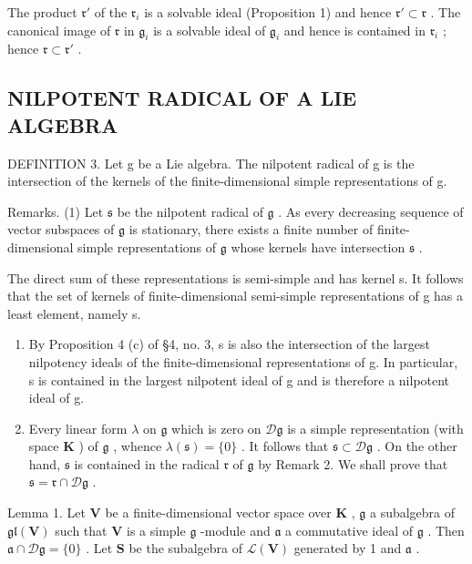 The product \(\mathfrak{r}'\) of the \(\mathfrak{r}_i\) is a solvable ideal (Proposition 1) and hence \(\mathfrak{r}' \subset \mathfrak{r}\) . The canonical image of \(\mathfrak{r}\) in \(\mathfrak{g}_i\) is a solvable ideal of \(\mathfrak{g}_i\) and hence is contained in \(\mathfrak{r}_i\) ; hence \(\mathfrak{r} \subset \mathfrak{r}'\) .

\subsection{NILPOTENT RADICAL OF A LIE ALGEBRA}

DEFINITION 3. Let g be a Lie algebra. The nilpotent radical of g is the intersection of the kernels of the finite-dimensional simple representations of g.

Remarks. (1) Let \(\mathfrak{s}\) be the nilpotent radical of \(\mathfrak{g}\) . As every decreasing sequence of vector subspaces of \(\mathfrak{g}\) is stationary, there exists a finite number of finite-dimensional simple representations of \(\mathfrak{g}\) whose kernels have intersection \(\mathfrak{s}\) .

The direct sum of these representations is semi-simple and has kernel s. It follows that the set of kernels of finite-dimensional semi-simple representations of g has a least element, namely s.

\begin{enumerate}
\def\labelenumi{(\arabic{enumi})}
\setcounter{enumi}{1}
\item
  By Proposition 4 (c) of §4, no. 3, s is also the intersection of the largest nilpotency ideals of the finite-dimensional representations of g. In particular, s is contained in the largest nilpotent ideal of g and is therefore a nilpotent ideal of g.
\item
  Every linear form \(\lambda\) on \(\mathfrak{g}\) which is zero on \(\mathcal{D}\mathfrak{g}\) is a simple representation (with space \(\mathbf{K}\) ) of \(\mathfrak{g}\) , whence \(\lambda (\mathfrak{s}) = \{0\}\) . It follows that \(\mathfrak{s} \subset \mathcal{D}\mathfrak{g}\) . On the other hand, \(\mathfrak{s}\) is contained in the radical \(\mathfrak{r}\) of \(\mathfrak{g}\) by Remark 2. We shall prove that \(\mathfrak{s} = \mathfrak{r} \cap \mathcal{D}\mathfrak{g}\) .
\end{enumerate}

Lemma 1. Let \(\mathbf{V}\) be a finite-dimensional vector space over \(\mathbf{K}\) , \(\mathfrak{g}\) a subalgebra of \(\mathfrak{gl}(\mathbf{V})\) such that \(\mathbf{V}\) is a simple \(\mathfrak{g}\) -module and \(\mathfrak{a}\) a commutative ideal of \(\mathfrak{g}\) . Then \(\mathfrak{a} \cap \mathcal{D}\mathfrak{g} = \{0\}\) . Let \(\mathbf{S}\) be the subalgebra of \(\mathcal{L}(\mathbf{V})\) generated by 1 and \(\mathfrak{a}\) .

